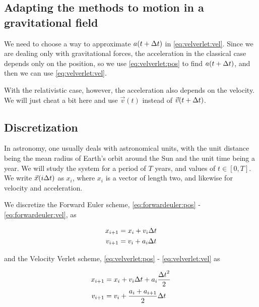 \documentclass[a4paper]{article}
\begin{document}
\subsection{Adapting the methods to motion in a gravitational field}

We need to choose a way to approximate $a(t + {\Delta t})$ in \ref{eq:velverlet:vel}. Since we are dealing only with gravitational forces, the acceleration in the classical case depends only on the position, so we use \ref{eq:velverlet:pos} to find $a(t + {\Delta t})$, and then we can use \ref{eq:velverlet:vel}.

With the relativistic case, however, the acceleration also depends on the velocity. We will just cheat a bit here and use $\vec{v}(t)$ instead of $\vec{v}(t + {\Delta t})$.


\subsection{Discretization}
In astronomy, one usually deals with astronomical units, with the unit distance being the mean radius of Earth's orbit around the Sun and the unit time being a year. We will study the system for a period of $T$ years, and values of $t \in [0, T]$. We write $\vec{x}(i {\Delta t})$ as $x_i$, where $x_i$ is a vector of length two, and likewise for velocity and acceleration.

We discretize the Forward Euler scheme, \ref{eq:forwardeuler:pos} - \ref{eq:forwardeuler:vel}, as

\begin{align}
    x_{i+1} &= x_{i} + v_{i}{\Delta t} \\
    v_{i+1} &= v_{i} + a_{i}{\Delta t}
\end{align}

and the Velocity Verlet scheme, \ref{eq:velverlet:pos} - \ref{eq:velverlet:vel} as

\begin{align}
    x_{i+1} &= x_{i} + v_{i}{\Delta t} + a_{i} \frac{{\Delta t}^2}{2} \\
    v_{i+1} &= v_{i} + \frac{a_{i} + a_{i+1}}{2}{\Delta t}
\end{align}


\end{document}
